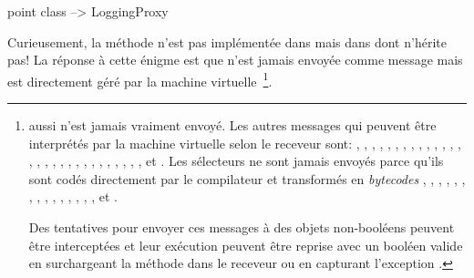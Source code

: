 \documentclass[a4paper,10pt,twoside]{book}
\begin{document}
\begin{code}{}
point class --> LoggingProxy
\end{code}
Curieusement, la méthode  n'est pas implémentée dans 
 mais dans  dont  n'hérite pas!
La réponse à cette énigme est que  n'est jamais envoyée comme message mais est directement géré par la machine virtuelle~\footnote{ aussi n'est jamais vraiment envoyé.
Les autres messages qui peuvent être interprétés par la machine virtuelle selon le receveur sont:
\mbox{\ct{+},}
\mbox{\ct{-},}
\mbox{\ct{<},}
\mbox{\ct{>},}
\mbox{\ct{<=},}
\mbox{\ct{>=},}
\mbox{\ct{=},}
\mbox{\ct{\~=},}
\mbox{\ct{*},}
\mbox{\ct{/},}
\mbox{\lct{\textbackslash},}
\mbox{\ct{==},}
\mbox{,}
\mbox{,}
\mbox{\ct{//},}
\mbox{,}
\mbox{,}
\mbox{,}
\mbox{,}
\mbox{,}
\mbox{,}
\mbox{,}
\mbox{,}
\mbox{,}
\mbox{,}
\mbox{,}
\mbox{,}
\mbox{,}
\mbox{,}
\mbox{} et \mbox{.}
Les sélecteurs ne sont jamais envoyés parce qu'ils sont codés directement par le compilateur et transformés en \emph{bytecodes} %
\mbox{,}
\mbox{,}
\mbox{,}
\mbox{,}
\mbox{,}
\mbox{,}
\mbox{,}
\mbox{,}
\mbox{,}
\mbox{}
\mbox{,}
\mbox{,}
\mbox{,}
\mbox{,}
\mbox{,}
\mbox{,}
\mbox{} et
\mbox{}.

Des tentatives pour envoyer ces messages à des objets non-booléens peuvent être interceptées et leur exécution peuvent être reprise avec un booléen valide en surchargeant la méthode  dans le receveur ou en capturant l'exception .}.
\end{document}
